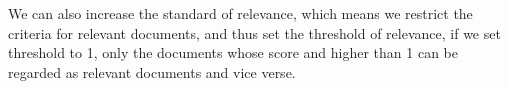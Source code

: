 We can also increase the standard of relevance, which means we restrict the criteria for relevant documents, and thus set the threshold of relevance, if we set threshold to 1, only the documents whose score and higher than 1 can be regarded as relevant documents and vice verse.

\begin{figure}[ht]
\centering
{}
\quad
{}
\end{figure}
